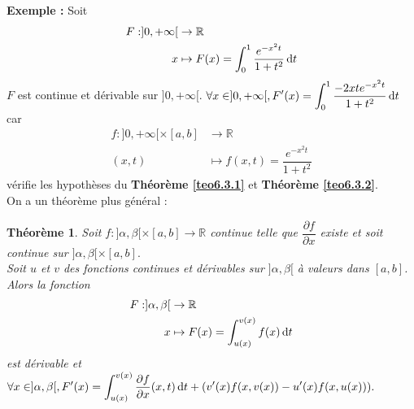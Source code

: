 \documentclass[11pt, a4paper]{book}
\newtheorem{teo}{Th\'eor\`eme}[section]
\begin{document}
\textbf{Exemple :} Soit \begin{align*}
F:]0,+\infty[&\rightarrow\mathbb{R}\\ x&\mapsto F(x)=\int_0^1\dfrac{e^{-x^2t}}{1+t^2}\,\mathrm{d} t
\end{align*}
$F$ est continue et d\'erivable sur $]0,+\infty[.$ $\forall x\in ]0,+\infty[, {\displaystyle F'(x)= \int_0^1\dfrac{-2xte^{-x^2t}}{1+t^2}\,\mathrm{d} t}$ car \begin{align*}
f:]0,+\infty[\times[a,b]&\rightarrow\mathbb{R}\\(x,t)&\mapsto f(x,t)=\dfrac{e^{-x^2t}}{1+t^2}
\end{align*} v\'erifie les hypoth\`eses du \textbf{Th\'eor\`eme \ref{teo6.3.1}} et \textbf{Th\'eor\`eme \ref{teo6.3.2}}.\\
On a un th\'eor\`eme plus g\'en\'eral :
\begin{teo}\label{teo6.3.3} Soit $f:]\alpha,\beta[\times[a,b]\rightarrow\mathbb{R}$ continue telle que $\dfrac{\partial f}{\partial x}$ existe et soit continue sur $]\alpha,\beta[\times[a,b].$ \\ Soit $u$ et $v$ des fonctions continues et d\'erivables sur $]\alpha,\beta[$ \`a valeurs dans $[a,b]$. Alors la fonction \begin{align*}
F:]\alpha,\beta[&\rightarrow\mathbb{R}\\x&\mapsto F(x)=\int_{u(x)}^{v(x)}f(x)\,\mathrm{d} t 
\end{align*} est d\'erivable et $\forall x\in]\alpha,\beta[,{\displaystyle F'(x)=\int_{u(x)}^{v(x)}\dfrac{\partial f}{\partial x}(x,t)\,\mathrm{d} t+\left(v'(x)f(x,v(x))-u'(x)f(x,u(x))\right)}.$
\end{teo}
\end{document}
